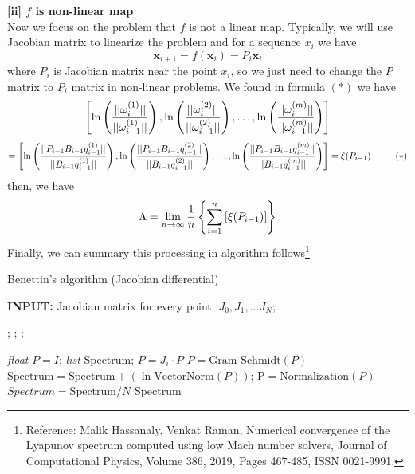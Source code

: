 \documentclass[12pt]{article}
\theoremstyle{plain}
\begin{document}
\textbf{[ii] $f$ is non-linear map}
\\\noindent Now we focus on the problem that $f$ is not a linear map. Typically, we will use Jacobian matrix to linearize the problem and for a sequence $x_i$ we have 
$$
\mathbf x_{i+1} = f(\mathbf x_i) = P_i \mathbf x_i
$$
where $P_i$ is Jacobian matrix near the point $x_i$, so we just need to change the $P$ matrix to $P_i$ matrix in non-linear problems. We found in formula $(*)$ we have
$$
\left[
\ln\left({||\omega^{(1)}_i|| \over ||\omega^{(1)}_{i-1}||}\right),
\ln\left({||\omega^{(2)}_i|| \over ||\omega^{(2)}_{i-1}||}\right),
\ldots,
\ln\left({||\omega^{(m)}_i|| \over ||\omega^{(m)}_{i-1}||}\right)
\right] 
$$
$$
= 
\left[
\ln\left({||P_{i-1}B_{i-1}q^{(1)}_{i-1}|| \over ||B_{i-1}q^{(1)}_{i-1}||}\right),
\ln\left({||P_{i-1}B_{i-1}q^{(2)}_{i-1}|| \over ||B_{i-1}q^{(2)}_{i-1}||}\right),
\ldots,
\ln\left({||P_{i-1}B_{i-1}q^{(m)}_{i-1}|| \over ||B_{i-1}q^{(m)}_{i-1}||}\right)
\right] 
= 
\xi(P_{i-1}) \ \ \ \ \ \ \ \ (*)
$$
then, we have
$$
\Lambda
= \lim_{n \rightarrow \infty}{1\over n}\left\{
\sum_{i = 1}^{n}
\left[
\xi(P_{i-1})
\right]\right\}
$$
Finally, we can summary this processing in algorithm follows\footnote{Reference: Malik Hassanaly, Venkat Raman, Numerical convergence of the Lyapunov spectrum computed using low Mach number solvers, Journal of Computational Physics, Volume 386, 2019, Pages 467-485, ISSN 0021-9991.}



\begin{algorithm}[H]
\caption{Benettin's algorithm (Jacobian differential)}\label{Lyapunov-spectrum}
\begin{algorithmic}
\State \textbf{INPUT:} Jacobian matrix for every point: $J_0, J_1, \ldots J_N$;

\State {};\EndProcedure
\State {};\EndProcedure
\State {};\EndProcedure

\State {}
\State \textit{float} $P = I$; 
\State \textit{list} Spectrum;
    \State $P = J_i \cdot P$
    \State $P = \text{Gram Schmidt}(P)$
    \State $\text{Spectrum} = \text{Spectrum} + (\ln\text{VectorNorm}(P))$;
    \State $\text{P} = \text{Normalization}(P)$
\EndFor
\State $Spectrum = \text{Spectrum} / N$
\State \Return Spectrum
\EndProcedure
\end{algorithmic}
\end{algorithm}
\end{document}
